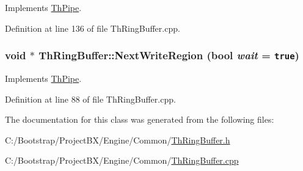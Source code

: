 Implements \hyperlink{class_th_pipe_3b31426377c575c926d8c0973213b151}{ThPipe}.

Definition at line 136 of file ThRingBuffer.cpp.\hypertarget{class_th_ring_buffer_9a74853f2ccbc0d1b441efec8bb553d3}{
\subsubsection[{NextWriteRegion}]{\setlength{\rightskip}{0pt plus 5cm}void $\ast$ ThRingBuffer::NextWriteRegion (bool {\em wait} = {\tt true})}}
\label{class_th_ring_buffer_9a74853f2ccbc0d1b441efec8bb553d3}




Implements \hyperlink{class_th_pipe_09ce5149941b4e2aa33c8b1c07ea252b}{ThPipe}.

Definition at line 88 of file ThRingBuffer.cpp.

The documentation for this class was generated from the following files:\begin{CompactItemize}
\item 
C:/Bootstrap/ProjectBX/Engine/Common/\hyperlink{_th_ring_buffer_8h}{ThRingBuffer.h}\item 
C:/Bootstrap/ProjectBX/Engine/Common/\hyperlink{_th_ring_buffer_8cpp}{ThRingBuffer.cpp}\end{CompactItemize}
